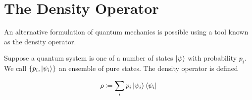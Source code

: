\documentclass[main.tex]{subfiles}
\begin{document}
%
%
%
%
%
%
%
%
%
\section{The Density Operator}

An alternative formulation of quantum mechanics is possible using a tool known as the density operator.

Suppose a quantum system is one of a number of states $\ket{\psi}$ with probability $p_i$. We call $\{p_i, \ket{\psi_i} \}$ an ensemble of pure states. The density operator is defined

\begin{align*}
\rho \coloneqq \sum_i p_i \ket{\psi_i}\bra{\psi_i}
\end{align*}
\end{document}
